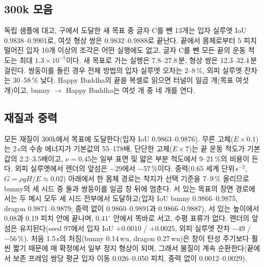 \subsection{300k 모음}
독립 샘플에 대고, 구에서 도달한 새 목표 중 글자 C를 뺀 13개는 입자 실루엣 IoU 0.9838--0.9901로, 여섯 형상 쌍은 0.9832--0.9888로
끝난다. 끝에서 몸체로부터 5 피치 떨어진 입자 10개 이상의 조각은 어떤 실행에도 없고, 글자 C를 뺀 모든 끝의 운동 척도는 최대
$1.3\times10^{-5}$이다. 새 목표로 가는 실행은 7.8--27.8\,분, 형상 쌍은 12.3--32.4\,분 걸린다. 쌍둥이를 돌린 경우 전체 방법의
입자 실루엣 오차는 2--8\,\%, 외피 실루엣 잔차는 30--58\,\% 낮다. Happy Buddha의 끝을 복셀로 읽으면 터널이 일곱 개(목표 여섯
개)이고, bunny $\to$ Happy Buddha는 여섯 개 중 네 개를 연다.

\subsection{재질과 중력}
\label{app:ch4_gravity_ko}
모든 재질이 300k에서 목표에 도달한다(입자 IoU 0.9863--0.9876). 무른 고체($E\times0.1$)는 2\,s의 수송 에너지가 기본값의
55--178배, 단단한 고체($E\times7$)는 끝 운동 척도가 기본값의 2.2--3.5배이고, $\nu=0.45$는 일부 표면 및 얇은 부분 척도에서
9--21\,\%의 비용이 든다. 외피 실루엣에서 렌더의 앞섬은 $-29$에서 $-57$\,\%이다. 중력(0.65 세계 단위\,s$^{-2}$, $G=\rho gH/E\approx0.02$)
아래에서 한 몸체 경로는 착지가 선택 기준을 7--9\,\% 올리므로 bunny의 세 시드 중 둘과 쌍둥이를 일곱 창 뒤에 멈춘다. 서 있는
목표의 장면 경로에서는 두 메시 모두 세 시드 전부에서 도달하고(입자 IoU bunny 0.9866--0.9875, dragon 0.9871--0.9879; 중력 없이
0.9860--0.9891과 0.9866--0.9887), 서 있는 높이에서 0.08과 0.19 피치 안에 끝나며, $0.41^\circ$ 안에서 똑바로 서고, 수평 표류가
없다. 렌더의 앞섬은 유지된다(seed 97에서 입자 IoU $+0.0010$ / $+0.0025$, 외피 실루엣 잔차 $-49$ / $-56$\,\%). 처음 1.5\,s의
처짐(bunny 0.14\,wu, dragon 0.27\,wu)은 창이 탄성 주기보다 훨씬 짧기 때문에 매 확정에서 일부 정지 형상이 되며, 그래서 물질이
계속 순환한다(끝에서 보존 프레임 쌍당 평균 입자 이동 0.026--0.050 피치, 중력 없이 0.0012--0.0029).

